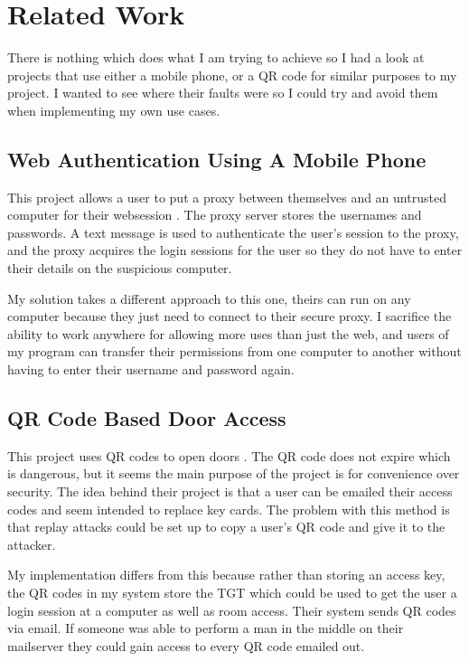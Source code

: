 \documentclass[]{report}   %
\begin{document}
\section{Related Work}
There is nothing which does what I am trying to achieve so I had a look at projects that use either a mobile phone, or a QR code for similar purposes to my project. I wanted to see where their faults were so I could try and avoid them when implementing my own use cases.

\subsection {Web Authentication Using A Mobile Phone}
This project allows a user to put a proxy between themselves and an untrusted computer for their websession \cite{Wu04secureweb}. The proxy server stores the usernames and passwords. A text message is used to authenticate the user's session to the proxy, and the proxy acquires the login sessions for the user so they do not have to enter their details on the suspicious computer.

My solution takes a different approach to this one, theirs can run on any computer because they just need to connect to their secure proxy. I sacrifice the ability to work anywhere for allowing more uses than just the web, and users of my program can transfer their permissions from one computer to another without having to enter their username and password again. 

\subsection{QR Code Based Door Access}
This project uses QR codes to open doors \cite{QRRelated}. The QR code does not expire which is dangerous, but it seems the main purpose of the project is for convenience over security. The idea behind their project is that a user can be emailed their access codes and seem intended to replace key cards. The problem with this method is that replay attacks could be set up to copy a user's QR code and give it to the attacker.

My implementation differs from this because rather than storing an access key, the QR codes in my system store the TGT which could be used to get the user a login session at a computer as well as room access. Their system sends QR codes via email. If someone was able to perform a man in the middle on their mailserver they could gain access to every QR code emailed out.
\end{document}
